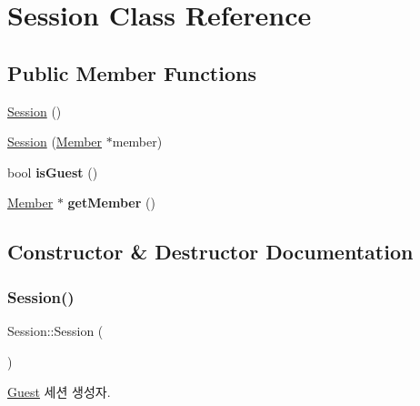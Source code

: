 \hypertarget{class_session}{}\section{Session Class Reference}
\label{class_session}
\subsection*{Public Member Functions}
\begin{DoxyCompactItemize}
\item 
\mbox{\hyperlink{class_session_ad92ef09b872c9227e38a6efdd4d8a837}{Session}} ()
\item 
\mbox{\hyperlink{class_session_a7f366328741cdcd4200f3184c85d507a}{Session}} (\mbox{\hyperlink{class_member}{Member}} $\ast$member)
\item 
\mbox{\label{class_session_aeae3ee95ffc22efdca7112eb10f84c4d}} 
bool {\bfseries is\+Guest} ()
\item 
\mbox{\label{class_session_a4867a03de74afef38b440ba32bee98ab}} 
\mbox{\hyperlink{class_member}{Member}} $\ast$ {\bfseries get\+Member} ()
\end{DoxyCompactItemize}


\subsection{Constructor \& Destructor Documentation}
\mbox{\label{class_session_ad92ef09b872c9227e38a6efdd4d8a837}} 
\subsubsection{\texorpdfstring{Session()}{Session()}\hspace{0.1cm}{\footnotesize\ttfamily [1/2]}}
{\footnotesize\ttfamily Session\+::\+Session (\begin{DoxyParamCaption}{ }\end{DoxyParamCaption})}

\mbox{\hyperlink{class_guest}{Guest}} 세션 생성자. \mbox{\label{class_session_a7f366328741cdcd4200f3184c85d507a}} 
